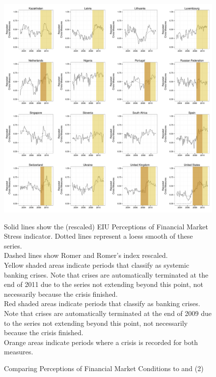 \documentclass[]{article}
\begin{document}
\begin{figure}
    \caption{Comparing Perceptions of Financial Market Conditions to \cite{laeven2013} and \cite{Reinhart2009} (2)}
    \label{compare_2}
    \begin{center}
        \includegraphics[scale=0.4]{figures/compare_to_lv_rr_2.pdf}
    \end{center}

    {\tiny{Solid lines show the (rescaled) EIU Perceptions of Financial Market Stress indicator. Dotted lines represent a loess smooth of these series. \\

    Dashed lines show Romer and Romer's \citeyearpar{Romer2015} index rescaled. \\

    Yellow shaded areas indicate periods that \cite{laeven2013} classify as systemic banking crises. Note that crises are automatically terminated at the end of 2011 due to the series not extending beyond this point, not necessarily because the crisis finished. \\

    Red shaded areas indicate periods that \cite{Reinhart2009} classify as banking crises. Note that crises are automatically terminated at the end of 2009 due to the series not extending beyond this point, not necessarily because the crisis finished. \\

    Orange areas indicate periods where a crisis is recorded for both measures.}}
\end{figure}
\end{document}
